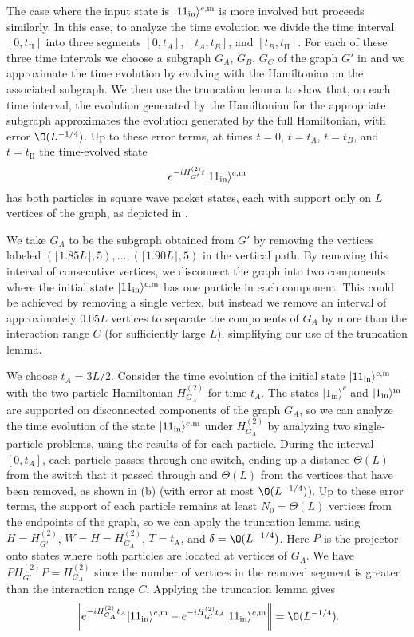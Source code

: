 \documentclass[../thesis-main/thesis-main]{subfiles}
\begin{document}
The case where the input state is $|11_{\text{in}}\rangle^{c,\mathrm{m}}$ is more involved but proceeds similarly. In this case, to analyze the time evolution we divide the time interval $[0,t_{\mathrm{II}}]$ into three segments $[0,t_{A}]$, $[t_{A},t_{B}]$, and $[t_{B},t_{\mathrm{II}}]$. For each of these three time intervals we choose a subgraph $G_{A}$, $G_{B}$, $G_C$ of the graph $G'$ in  and we approximate the time evolution by evolving with the Hamiltonian on the associated subgraph. We then use the truncation lemma to show that, on each time interval, the evolution generated by the Hamiltonian for the appropriate subgraph approximates the evolution generated by the full Hamiltonian, with error $\O(L^{-{1}/{4}})$. Up to these error terms, at times $t=0$, $t=t_A$, $t=t_B$, and $t=t_{\mathrm{II}}$ the time-evolved state 
\[
e^{-iH_{G'}^{(2)}t}|11_{\text{in}}\rangle^{c,\mathrm{m}}
\]
has both particles in square wave packet states, each with support only on $L$ vertices of the graph, as depicted in .

We take $G_A$ to be the subgraph obtained from $G'$ by removing the vertices labeled $(\lceil 1.85L\rceil,5)\allowbreak, \ldots,\allowbreak (\lceil 1.90 L\rceil,5)$ in the vertical path. By removing this interval of consecutive vertices, we disconnect the graph into two components where the initial state $|11_{\text{in}}\rangle^{c,\mathrm{m}}$ has one particle in each component. This could be achieved by removing a single vertex, but instead we remove an interval of approximately $0.05L$ vertices to separate the components of $G_A$ by more than the interaction range $C$ (for sufficiently large $L$), simplifying our use of the truncation lemma.

 We choose $t_{A}={3L}/{2}$. Consider the time evolution of the initial state $|11_\text{in}\rangle^{c,\mathrm{m}}$ with the two-particle Hamiltonian $H_{G_A}^{(2)}$ for time $t_A$. The states $|1_ {\text{in}}\rangle^c$ and $|1_\text{in}\rangle^{\mathrm{m}}$ are supported on disconnected components of the graph $G_A$, so we can analyze the time evolution of the state $|11_\text{in}\rangle^{c,\mathrm{m}}$ under $H_{G_A}^{(2)}$ by analyzing two single-particle problems, using the results of  for each particle. During the interval $[0,t_A]$,  each particle passes through one switch, ending up a distance $\Theta(L)$ from the switch that it passed through and $\Theta(L)$ from the vertices that have been removed, as shown in (b) (with error at most $\O(L^{-{1}/{4}})$). Up to these error terms, the support of each particle remains at least $N_0=\Theta(L)$ vertices from the endpoints of the graph, so we can apply the truncation lemma using $H=H_{G'}^{(2)}$, $W=\tilde{H}=H_{G_A}^{(2)}$, $T=t_{\mathrm{A}}$, and $\delta=\O(L^{-{1}/{4}})$. Here $P$ is the projector onto states where both particles are located at vertices of $G_A$. We have $P H_{G'}^{(2)}P=H_{G_A}^{(2)}$ since the number of vertices in the removed segment is greater than the interaction range $C$. Applying the truncation lemma gives
\[
\left\Vert e^{-iH_{G_A}^{(2)}t_A}|11_\text{in}\rangle^{c,\med}-e^{-iH_{G'}^{(2)}t_A}|11_\text{in}\rangle^{c,\med}\right\Vert=\O(L^{-{1}/{4}}).
\]
\end{document}
